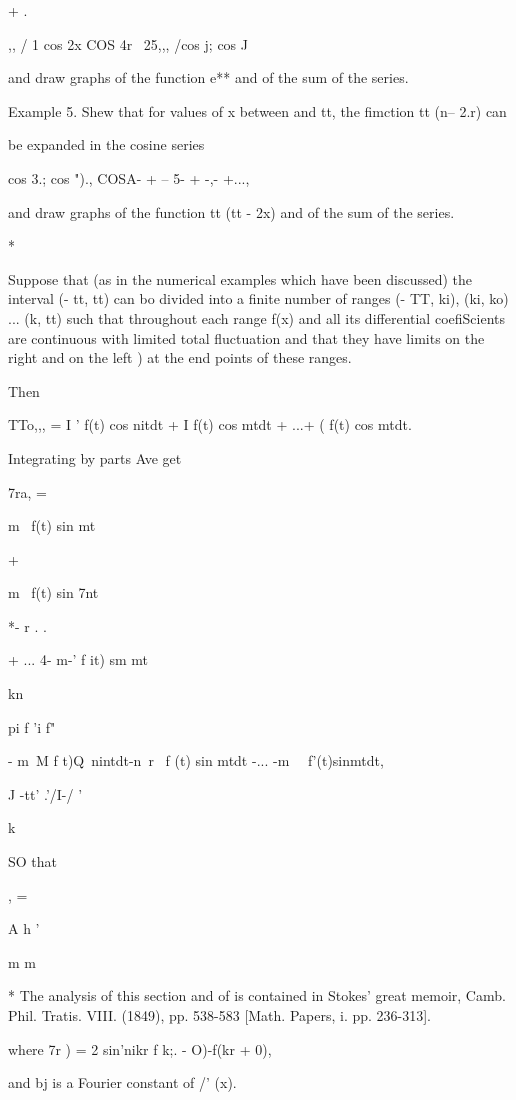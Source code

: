 + .

,, / 1 cos 2x COS 4r \ 25,,, /cos j; cos J

and draw graphs of the function e** and of the sum of the series.

Example 5. Shew that for values of x between and tt, the fimction tt
(n-- 2.r) can

be expanded in the cosine series

cos 3.; cos ")., COSA- + -- 5- + -,- +...,

and draw graphs of the function tt (tt - 2x) and of the sum of the
series.

*

Suppose that (as in the numerical examples which have been discussed)
the interval (- tt, tt) can bo divided into a finite number of ranges
(- TT, ki), (ki, ko) ... (k, tt) such that throughout each range f(x)
and all its differential coefiScients are continuous with limited
total fluctuation and that they have limits on the right and on the
left ) at the end points of these ranges.

Then

TTo,,, = I ' f(t) cos nitdt + I f(t) cos mtdt + ...+ ( f(t) cos mtdt.

Integrating by parts Ave get

7ra, =

m~ f(t) sin mt

+

m~ f(t) sin 7nt

*- r . .

+ ... 4- m-' f it) sm mt

kn

pi f 'i f"

- m~M f t)Q\ nintdt-n\ r \ f (t) sin mtdt -... -m~ \ f'(t)sinmtdt,

J -tt' .'/I-/ '

k

SO that

, =

A h '

m m

* The analysis of this section and of is contained in Stokes'
great memoir, Camb. Phil. Tratis. VIII. (1849), pp. 538-583 [Math.
Papers, i. pp. 236-313].

%
%

where 7r ) = 2 sin'nikr f k;. - O)-f(kr + 0),

and bj is a Fourier constant of /' (x).

